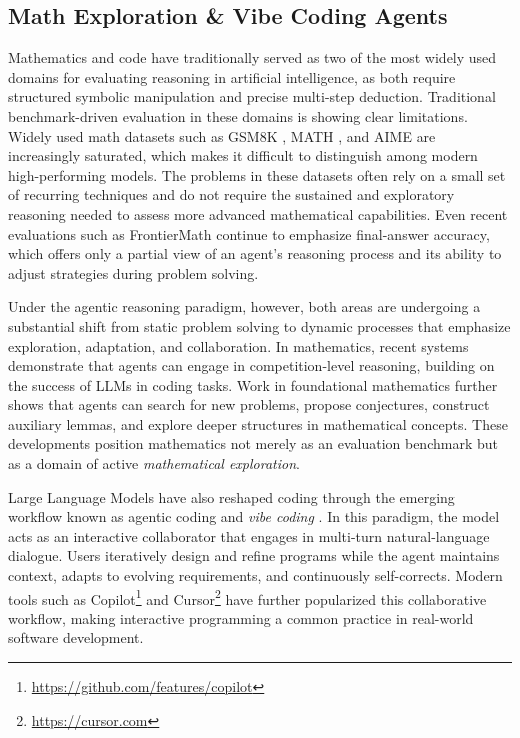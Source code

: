 \subsection{Math Exploration \& Vibe Coding Agents}
\label{sec:app-math}
Mathematics and code have traditionally served as two of the most widely used domains for evaluating reasoning in artificial intelligence, as both require structured symbolic manipulation and precise multi-step deduction. Traditional benchmark-driven evaluation in these domains is showing clear limitations. Widely used math datasets such as GSM8K \cite{cobbe2021training}, MATH \cite{hendrycks2021measuring}, and AIME \cite{MAA_AIME} are increasingly saturated, which makes it difficult to distinguish among modern high-performing models. The problems in these datasets often rely on a small set of recurring techniques and do not require the sustained and exploratory reasoning needed to assess more advanced mathematical capabilities. Even recent evaluations such as FrontierMath \cite{glazer2024frontiermath} continue to emphasize final-answer accuracy, which offers only a partial view of an agent’s reasoning process and its ability to adjust strategies during problem solving.

Under the agentic reasoning paradigm, however, both areas are undergoing a substantial shift from static problem solving to dynamic processes that emphasize exploration, adaptation, and collaboration. In mathematics, recent systems \citep{novikov2025alphaevolve,luong2025towards,trinh2024solving,romera2024mathematical} demonstrate that agents can engage in competition-level reasoning, building on the success of LLMs in coding tasks. Work in foundational mathematics \citep{swirszcz2025advancing,georgiev2025mathematical} further shows that agents can search for new problems, propose conjectures, construct auxiliary lemmas, and explore deeper structures in mathematical concepts. These developments position mathematics not merely as an evaluation benchmark but as a domain of active \emph{mathematical exploration}.

Large Language Models have also reshaped coding through the emerging workflow known as agentic coding and \emph{vibe coding} \citep{karpathy2025vibecoding,willison2025vibecoding}. In this paradigm, the model acts as an interactive collaborator that engages in multi-turn natural-language dialogue. Users iteratively design and refine programs while the agent maintains context, adapts to evolving requirements, and continuously self-corrects. Modern tools such as Copilot\footnote{\url{https://github.com/features/copilot}} and Cursor\footnote{\url{https://cursor.com}} have further popularized this collaborative workflow, making interactive programming a common practice in real-world software development.

